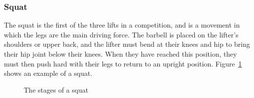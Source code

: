 \subsubsection{Squat}

The squat is the first of the three lifts in a competition, and is a movement in which the legs are the main driving force. The barbell is placed on the lifter’s shoulders or upper back, and the lifter must bend at their knees and hip to bring their hip joint below their knees. When they have reached this position, they must then push hard with their legs to return to an upright position. Figure~\ref{fig:squat_stages} shows an example of a squat.

\begin{figure}[H]
    \centering
\caption{The stages of a squat}
\label{fig:squat_stages}
\end{figure}

